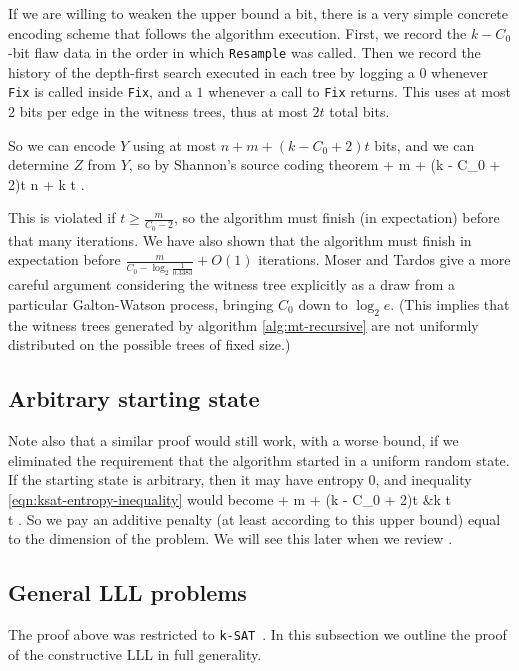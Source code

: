 \documentclass[twocolumn]{article}
\newcommand{\ksat}{\texttt{k-SAT}~}
\def\seqn#1\eeqn{\begin{align}#1\end{align}}
\begin{document}
If we are willing to weaken the upper bound a bit, there is a very simple concrete encoding scheme that follows the algorithm execution.  First, we record the $k-C_0$-bit flaw data in the order in which \texttt{Resample} was called.  Then we record the history of the depth-first search executed in each tree by logging a $0$ whenever \texttt{Fix} is called inside \texttt{Fix}, and a $1$ whenever a call to \texttt{Fix} returns.  This uses at most $2$ bits per edge in the witness trees, thus at most $2t$ total bits.

So we can encode $Y$ using at most $n + m + (k - C_0 + 2)t$ bits, and we can determine $Z$ from $Y$, so by Shannon's source coding theorem
\seqn
  n + m + (k - C_0 + 2)t \leq n + k t \label{eqn:ksat-entropy-inequality}.
\eeqn

This is violated if $t \geq \frac{m}{C_0 - 2}$, so the algorithm must finish (in expectation) before that many iterations.  We have also shown that the algorithm must finish in expectation before $\frac{m}{C_0 - \log_2 \frac{1}{0.3383}} + O(1)$ iterations.  Moser and Tardos give a more careful argument considering the witness tree explicitly as a draw from a particular Galton-Watson process, bringing $C_0$ down to $\log_2 e$.  (This implies that the witness trees generated by algorithm \ref{alg:mt-recursive} are not uniformly distributed on the possible trees of fixed size.)

\subsection{Arbitrary starting state}
Note also that a similar proof would still work, with a worse bound, if we eliminated the requirement that the algorithm started in a uniform random state.  If the starting state is arbitrary, then it may have entropy $0$, and inequality \ref{eqn:ksat-entropy-inequality} would become
\seqn
  n + m + (k - C_0 + 2)t &\leq k t \\
  \implies t \leq {} .
\eeqn
So we pay an additive penalty (at least according to this upper bound) equal to the dimension of the problem.  We will see this later when we review \cite{achlioptas2014random}.

\subsection{General LLL problems}
The proof above was restricted to \ksat.  In this subsection we outline the proof of the constructive LLL in full generality.
\end{document}
